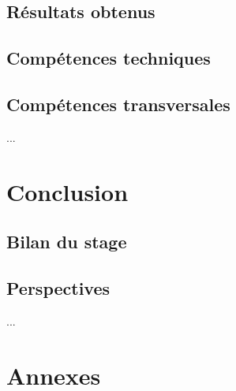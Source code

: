 \documentclass[12pt,a4paper]{report}
\begin{document}
\section{Résultats obtenus}
\section{Compétences techniques}
\section{Compétences transversales}
... %

\chapter{Conclusion}
\section{Bilan du stage}
\section{Perspectives}
... %

\appendix
\chapter{Annexes}
\end{document}
